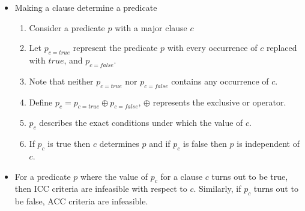 \documentclass[a4paper]{article}
\begin{document}
\begin{itemize}
    \item Making a clause determine a predicate
    \begin{enumerate}
        \item Consider a predicate $p$ with a major clause $c$
        \item Let $p_{c=true}$ represent the predicate $p$ with every occurrence of $c$ replaced with $true$, and $p_{c=false}$.
        \item Note that neither $p_{c=true}$ nor $p_{c=false}$ contains any occurrence of $c$.
        \item Define $p_c=p_{c=true}\oplus p_{c=false}$, $\oplus$ represents the exclusive or operator.
        \item $p_c$ describes the exact conditions under which the value of $c$.
        \item If $p_c$ is true then $c$ determines $p$ and if $p_c$ is false then $p$ is independent of $c$.
    \end{enumerate}
    \item For a predicate $p$ where the value of $p_c$ for a clause $c$ turns out to be true, then ICC criteria are infeasible with respect to $c$. Similarly, if $p_c$ turns out to be false, ACC criteria are infeasible.
\end{itemize}
\end{document}
